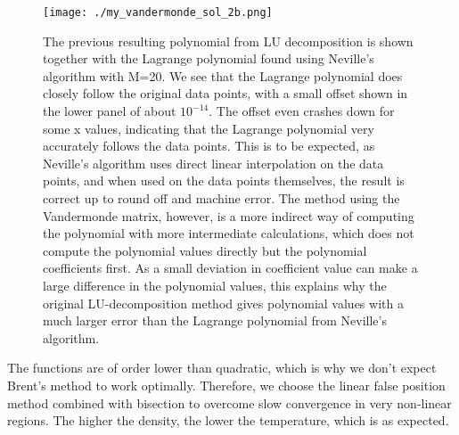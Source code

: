 \begin{figure}[h!]
    \centering
    \texttt{[image: ./my\_vandermonde\_sol\_2b.png]}
    \caption{The previous resulting polynomial from LU decomposition is shown together with the Lagrange polynomial found using Neville's algorithm with M=20. We see that the Lagrange polynomial does closely follow the original
    data points, with a small offset shown in the lower panel of about $10^{-14}$. The offset even crashes down for some x values, indicating that the Lagrange polynomial very accurately
    follows the data points. This is to be expected, as Neville's algorithm uses direct linear interpolation on the data points, and when used on the data points themselves, the result is correct up to round off and machine error.
    The method using the Vandermonde matrix, however, is a more indirect way of computing the polynomial with more intermediate calculations, which does not compute the polynomial values directly but the polynomial coefficients first.
    As a small deviation in coefficient value can make a large difference in the polynomial values, this explains why the original LU-decomposition method gives polynomial values with a much larger error than the Lagrange polynomial from Neville's algorithm.}
    \label{fig:2b}
\end{figure}





The functions are of order lower than quadratic, which is why we don't expect Brent's method
to work optimally. Therefore, we choose the linear false position method combined with bisection to overcome slow convergence in very non-linear regions.
The higher the density, the lower the temperature, which is as expected.